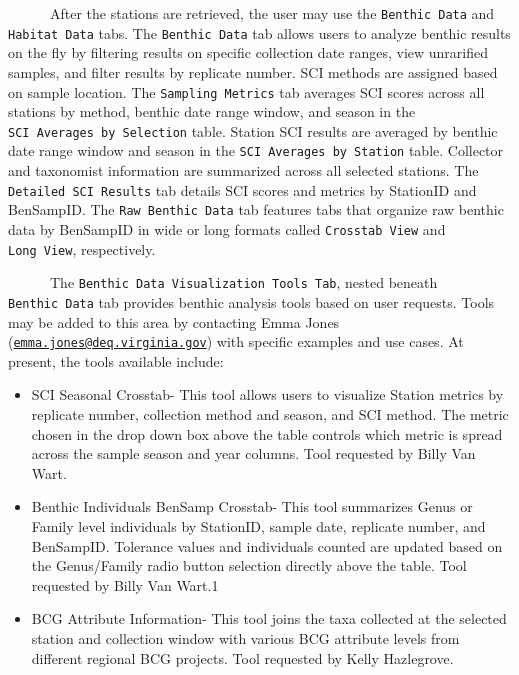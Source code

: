 \documentclass[
]{article}
\providecommand{\tightlist}{%
  \setlength{\itemsep}{0pt}\setlength{\parskip}{0pt}}
\begin{document}
~~~~~~After the stations are retrieved, the user may use the
\texttt{Benthic\ Data} and \texttt{Habitat\ Data} tabs. The
\texttt{Benthic\ Data} tab allows users to analyze benthic results on
the fly by filtering results on specific collection date ranges, view
unrarified samples, and filter results by replicate number. SCI methods
are assigned based on sample location. The \texttt{Sampling\ Metrics}
tab averages SCI scores across all stations by method, benthic date
range window, and season in the \texttt{SCI\ Averages\ by\ Selection}
table. Station SCI results are averaged by benthic date range window and
season in the \texttt{SCI\ Averages\ by\ Station} table. Collector and
taxonomist information are summarized across all selected stations. The
\texttt{Detailed\ SCI\ Results} tab details SCI scores and metrics by
StationID and BenSampID. The \texttt{Raw\ Benthic\ Data} tab features
tabs that organize raw benthic data by BenSampID in wide or long formats
called \texttt{Crosstab\ View} and \texttt{Long\ View}, respectively.

~~~~~~The \texttt{Benthic\ Data\ Visualization\ Tools\ Tab}, nested
beneath \texttt{Benthic\ Data} tab provides benthic analysis tools based
on user requests. Tools may be added to this area by contacting Emma
Jones
(\href{mailto:emma.jones@deq.virginia.gov}{\nolinkurl{emma.jones@deq.virginia.gov}})
with specific examples and use cases. At present, the tools available
include:

\begin{itemize}
\tightlist
\item
  SCI Seasonal Crosstab- This tool allows users to visualize Station
  metrics by replicate number, collection method and season, and SCI
  method. The metric chosen in the drop down box above the table
  controls which metric is spread across the sample season and year
  columns. Tool requested by Billy Van Wart.
\item
  Benthic Individuals BenSamp Crosstab- This tool summarizes Genus or
  Family level individuals by StationID, sample date, replicate number,
  and BenSampID. Tolerance values and individuals counted are updated
  based on the Genus/Family radio button selection directly above the
  table. Tool requested by Billy Van Wart.1
\item
  BCG Attribute Information- This tool joins the taxa collected at the
  selected station and collection window with various BCG attribute
  levels from different regional BCG projects. Tool requested by Kelly
  Hazlegrove.
\end{itemize}
\end{document}
